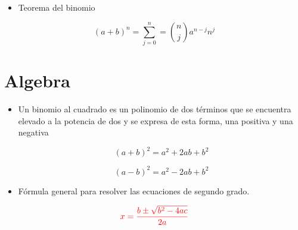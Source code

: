 \documentclass[12pt, letterpaper]{article}
\begin{document}
\begin{itemize}
    \item [ \clubsuit] Teorema del binomio

\end{itemize}

    $$ (a + b)^n = \sum_{j=0}^{n} = \binom{n}{j} a^{n - j} n^j $$


    
\section{Algebra}
\begin{itemize}
    \item[\star] Un binomio al cuadrado es un polinomio de dos términos que se encuentra elevado a la potencia de dos y se expresa de esta forma, una positiva y una negativa
 
    $$ (a + b)^2 =  a^2 + 2ab +b^2 $$
    
    $$ (a - b)^2 =  a^2 - 2ab +b^2 $$
\end{itemize}
\begin{itemize}
    \item[\bigstar]  Fórmula general para resolver las ecuaciones de segundo grado.
\end{itemize}

    $$\textcolor{red}{ x = \frac{b \pm \sqrt{b^2 - 4ac}}{2a}}$$



\end{document}
